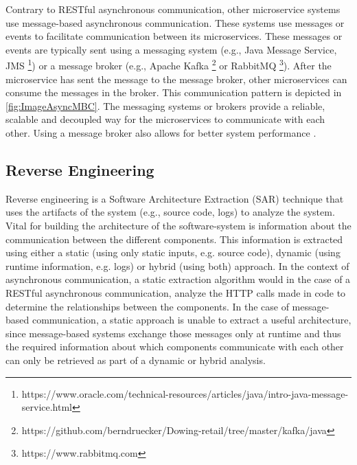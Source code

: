 Contrary to RESTful asynchronous communication, other microservice systems use message-based asynchronous communication.
These systems use messages or events to facilitate communication between its microservices.
These messages or events are typically sent using a messaging system (e.g., Java Message Service, JMS \footnote{https://www.oracle.com/technical-resources/articles/java/intro-java-message-service.html}) or a message broker (e.g., Apache Kafka \footnote{https://github.com/berndruecker/Dowing-retail/tree/master/kafka/java} or RabbitMQ \footnote{https://www.rabbitmq.com}).
After the microservice has sent the message to the message broker, other microservices can consume the messages in the broker.
This communication pattern is depicted in \autoref{fig:ImageAsyncMBC}.
The messaging systems or brokers provide a reliable, scalable and decoupled way for the microservices to communicate with each other.
Using a message broker also allows for better system performance \cite{Singh2021}.


\subsection{Reverse Engineering}
\label{sec:Foundation:SAR}
Reverse engineering is a Software Architecture Extraction (SAR) technique that uses the artifacts of the system (e.g., source code, logs) to analyze the system.
Vital for building the architecture of the software-system is information about the communication between the different components.
This information is extracted using either a static (using only static inputs, e.g. source code), dynamic (using runtime information, e.g. logs) or hybrid (using both) approach.
In the context of asynchronous communication, a static extraction algorithm would in the case of a RESTful asynchronous communication, analyze the HTTP calls made in code to determine the relationships between the components.
In the case of message-based communication, a static approach is unable to extract a useful architecture, since message-based systems exchange those messages only at runtime and thus the required information about which components communicate with each other can only be retrieved as part of a dynamic or hybrid analysis. \cite{Singh2021,Mayer2018}



